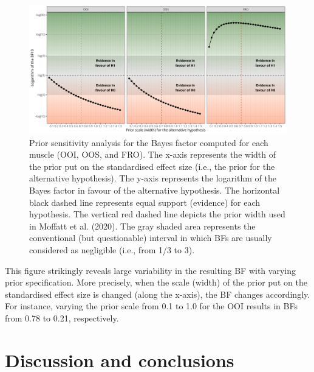 \documentclass[
  english,
  man, donotrepeattitle,floatsintext]{apa6}
\begin{document}
\begin{figure}[!h]

{\centering \includegraphics[width=1\linewidth]{manuscript_files/figure-latex/sensitivity-1} 

}

\caption{Prior sensitivity analysis for the Bayes factor computed for each muscle (OOI, OOS, and FRO). The x-axis represents the width of the prior put on the standardised effect size (i.e., the prior for the alternative hypothesis). The y-axis represents the logarithm of the Bayes factor in favour of the alternative hypothesis. The horizontal black dashed line represents equal support (evidence) for each hypothesis. The vertical red dashed line depicts the prior width used in Moffatt et al. (2020). The gray shaded area represents the conventional (but questionable) interval in which BFs are usually considered as negligible (i.e., from 1/3 to 3).}\label{fig:sensitivity}
\end{figure}

This figure strikingly reveals large variability in the resulting BF with varying prior specification. More precisely, when the scale (width) of the prior put on the standardised effect size is changed (along the x-axis), the BF changes accordingly. For instance, varying the prior scale from 0.1 to 1.0 for the OOI results in BFs from 0.78 to 0.21, respectively.

\hypertarget{discussion-and-conclusions}{%
\section{Discussion and conclusions}\label{discussion-and-conclusions}}
\end{document}
